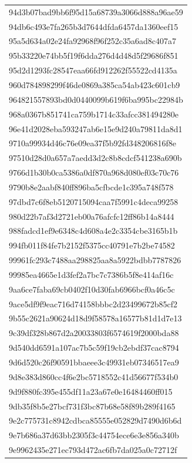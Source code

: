 \begin{tabular}{l}
94d3b07bad9bb6f95d15a68739a3066d888a96ae59 \\
94db6c493e7fa265b3d7644dfda6457da1360eef15 \\
95a5d634a02e24fa92968f96f252c35a6ad8c407a7 \\
95b33220e74bb5f19f6dda276d4d48d5f29686f851 \\
95d2d1293fc28547eaa66fd912262f55522cd4135a \\
960d784898299f46de0869a385ca54ab423c601cb9 \\
964821557893bd0d0440099b619f6ba995bc22984b \\
968a0367b851741ca759b1714c33afcc381494280e \\
96e41d2028eba593247ab6e15e9d240a79811da8d1 \\
9710a99934d46c76e09ea37f5b92fd348206816f8e \\
97510d28d0a657a7aedd3d2c8b8cdcf541238a690b \\
9766d1b30b0ca5386a0df870a968d080ef03c70c76 \\
9790b8e2aabf840ff896ba5cfbcde1c395a748f578 \\
97dbd7c6f8eb5120715094caa7f5991c4deca99258 \\
980d22b7af3d2721eb00a76afcfc12ff86b14a8444 \\
988fadcd1ef9e6348c4d608a4e2c3354cbe3165b1b \\
994fb011f84fe7b2152f5375cc40791e7b2be74582 \\
99961fc293c7488aa298825aa8a5922bdbb7787826 \\
99985ea4665e1d3fef2a7bc7c7386b5f8e414af16c \\
9aa6ce7faba69cb0402f10d30fab6966bcf0a46c5c \\
9ace5df9f9eac716d74158bbbc2d23499672b85cf2 \\
9b55c2621a90624d18d9f58578a16577b81d1d7e13 \\
9c39df328b867d2a20033803f6574619f2000bda88 \\
9d540dd6591a107ac7b5c59f19cb2ebdf37cac8794 \\
9d6d520c26f90591bbaeee3c49931eb07346517ea9 \\
9d8e383d860cc4f6e2bc5718552c41d56677f534b0 \\
9d9f880fc395e455df11a23a67e0e16484460ff015 \\
9db35f8b5e27bcf731f3bc87b68e58f89b289f4165 \\
9e2c775731c8942cdbca85555e052829d7490d6b6d \\
9e7b686a37d63bb2305f3c44754ece6e3e856a340b \\
9e9962435e271ec793d472ac6fb7da025a0c72712f \\

\end{tabular}
